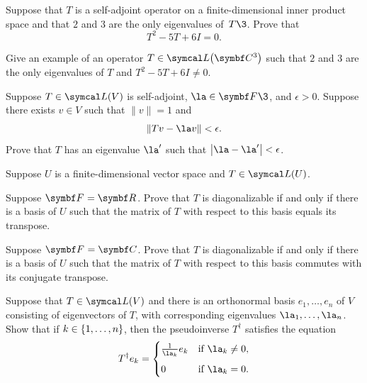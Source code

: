 \begin{exercises}
\exercise
Suppose that $T$ is a self-adjoint operator on a finite-dimensional inner
product space and that $2$ and $3$ are the only eigenvalues of~$T\3$.  Prove that
\[
T^2 - 5T + 6I = 0.
\]
\exercisedisplayend


\exercise
Give an example of an operator $T \in \L\paren[\big]{\C{3}}$ such that $2$ and $3$ are the only
eigenvalues of $T$ and
$
T^2 - 5T + 6I \ne 0$.


\exercise
Suppose $T \in \L(V)$ is self-adjoint, $\la \in \F{}\3$, and $\epsilon > 0$.  Suppose
there exists $v \in V$ such that $\|v\| = 1$ and
\[
\|Tv - \la v\| < \epsilon.
\]
Prove that $T$ has an eigenvalue $\la'$ such that $\abs[\big]{\la - \la'} < \epsilon$.

\exercise
Suppose $U$ is a finite-dimensional vector space and $T \in \L(U)$.\label{Diag2}
\begin{subtheorem}
\item
Suppose $\F{} = \R{}$. Prove that $T$ is diagonalizable if and only if there is a basis of $U$ such that the matrix of $T$ with respect to this basis equals its transpose.
\item
Suppose $\F{} = \C{}$. Prove that $T$ is diagonalizable if and only if there is a basis of $U$ such that the matrix of $T$ with respect to this basis commutes with its conjugate transpose.
\end{subtheorem}


\exercise
Suppose that $T \in \L(V)$ and there is an orthonormal basis $e_1, \ldots, e_n$ of $V$ consisting of eigenvectors of $T$, with corresponding eigenvalues $\la_1, \ldots, \la_n$. Show that if
$k \in \{1, \ldots, n\}$, then the pseudoinverse $T^\dagger$ satisfies the equation
\[
T^\dagger e_k = \begin{cases}
\frac{1}{\la_k} e_k & \text{if } \la_k \ne 0, \\[6bp]
0 & \text{if } \la_k = 0.
\end{cases}
\]
\exercisedisplayend


\end{exercises}

